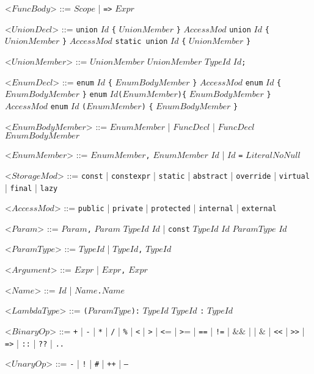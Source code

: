 \documentclass{article}
\newcommand{\gtext}[1]{<$#1$>}
\newcommand{\glit}[1]{\texttt{#1}}
\begin{document}
\begin{grammar}
	\gtext{FuncBody} ::= $Scope$ | \glit{=>} $Expr$
	
	\gtext{UnionDecl} ::= \glit{union} $Id$ \glit{\{} $UnionMember$ \glit{\}}
	\alt $AccessMod$ \glit{union} $Id$ \glit{\{} $UnionMember$ \glit{\}}
	\alt $AccessMod$ \glit{static union} $Id$ \glit{\{} $UnionMember$ \glit{\}}
	
	\gtext{UnionMember} ::= $UnionMember$ $UnionMember$
	\alt $TypeId$ $Id$\glit{;}	
	
	\gtext{EnumDecl} ::= \glit{enum} $Id$ \glit{\{} $EnumBodyMember$ \glit{\}}
	\alt $AccessMod$ \glit{enum} $Id$ \glit{\{} $EnumBodyMember$ \glit{\}}
	\alt \glit{enum} $Id$\glit{(}$EnumMember$\glit{)\{} $EnumBodyMember$ \glit{\}}
	\alt $AccessMod$ \glit{enum} $Id$ \glit{(}$EnumMember$\glit{)} \glit{\{} $EnumBodyMember$ \glit{\}}
	
	\gtext{EnumBodyMember} ::= $EnumMember$ | $FuncDecl$ | $FuncDecl$ $EnumBodyMember$
	
	\gtext{EnumMember} ::=  $EnumMember$\glit{,} $EnumMember$
	\alt $Id$ | $Id$ \glit{=} $LiteralNoNull$
	
	\gtext{StorageMod} ::= \glit{const} | \glit{constexpr} | \glit{static} | \glit{abstract} | \glit{override} | \glit{virtual} | \glit{final} | \glit{lazy}
	
	\gtext{AccessMod} ::= \glit{public} | \glit{private} | \glit{protected} | \glit{internal} | \glit{external}
	
	\gtext{Param} ::= $Param$\glit{,} $Param$
	\alt $TypeId$ $Id$ | \glit{const} $TypeId$ $Id$
	\alt $ParamType$ $Id$
	
	\gtext{ParamType} ::= $TypeId$ | $TypeId$\glit{,} $TypeId$

	\gtext{Argument} ::= $Expr$ | $Expr$\glit{,} $Expr$
	
	\gtext{Name} ::= $Id$ | $Name$\glit{.}$Name$	
	
	\newpage	
	
	\gtext{LambdaType} ::= \glit{(}$ParamType$\glit{):} $TypeId$
	\alt $TypeId$ \glit{:} $TypeId$
	
	\gtext{BinaryOp} ::= \glit{+} | \glit{-} | \glit{*} | \glit{/} | \glit{\%} | \glit{\textless} | \glit{\textgreater} | \glit{\textless}= | \glit{\textgreater}= | \glit{==} | \glit{!=}
	\alt \glit{\textbar\textbar} | $\&\&$ | \glit{\textbar} | $\&$ | \glit{\textless\textless} | \glit{\textgreater\textgreater} | \glit{=>} | \glit{::} | \glit{??} | \glit{..}
	
	\gtext{UnaryOp} ::= \glit{-} | \glit{!} | \glit{\#} | \glit{++} | \glit{--}
	

\end{grammar}
\end{document}
